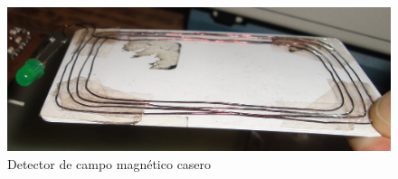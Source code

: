 \begin{figure}[H]
\centering
  \begin{center}
  \includegraphics[scale=.2]{Imagenes/detector.jpg}
  \end{center}
  \caption{Detector de campo magnético casero}\label{Fig:detector} 
\end{figure}


